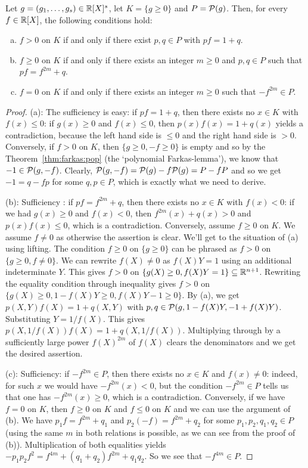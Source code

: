 \begin{theorem}
	\label{stellensaetze}
	Let $g = (g_1,\ldots,g_s) \in \mathbb{R}[X]^s$, let $K = \{ g \ge 0\}$ and $P= \mathcal{P}(g)$. Then, for every $f \in \mathbb{R}[X]$, the following conditions hold:
	\begin{enumerate}[(a)]
		\item $f>0$ on $K$ if and only if there exist $p, q \in P$ with $p f = 1+ q$. 
		\item $f \ge 0$ on $K$ if and only if there exists an integer $m \ge 0$ and $p, q \in P$ such that $p f = f^{2m} + q$. 
		\item $f=0$ on $K$ if and only if there exists an integer $m \ge 0$ such that $-f^{2m} \in P$. 
	\end{enumerate}
\end{theorem}
\begin{proof}
	(a): The sufficiency is easy: if $p f = 1+q$, then there exists no $x \in K$ with $f(x) \le 0$: if $g(x) \ge 0$ and $f(x) \le 0$, then $p(x) f(x) = 1+q(x)$ yields a contradiction, because the left hand side is $\le 0$ and the right hand side is $> 0$. Conversely,  if $f>0$ on $K$, then $\{ g \ge 0,-f \ge 0 \}$ is empty and so by the  Theorem~\ref{thm:farkas:pop} (the `polynomial Farkas-lemma'), we know that $-1 \in \mathcal{P}(g,-f)$. Clearly, $\mathcal{P}(g,-f) = \mathcal{P}(g) - f \mathcal{P}(g) = P - f P$ and so we get $-1 = q - f p$ for some $q, p \in P$, which is exactly what we need to derive. 
	
	(b): Sufficiency : if $p f = f^{2m} + q$, then there exists no $x \in K$ with $f(x) < 0$: if we had $g(x) \ge 0$ and $f(x) < 0$, then $f^{2m}(x) + q(x) > 0$ and $p(x) f(x) \le 0$, which is a contradiction. Conversely, assume $f \ge 0$ on $K$. We assume $f \ne 0$ as otherwise the assertion is clear. We'll get to the situation of (a) using lifting. The condition $f \ge 0$ on $\{g \ge 0\}$ can be phrased as $f > 0$ on $\{ g \ge 0, f \ne 0\}$. We can rewrite $f(X) \ne 0$ as $f(X) Y =1$ using an additional indeterminate $Y$. This gives $f > 0$ on $\{ g(X) \ge 0, f(X) Y =  1\} \subseteq \mathbb{R}^{n+1}$. Rewriting the equality condition through inequality gives $f> 0$ on $\{g(X) \ge 0, 1 - f(X) Y \ge 0, f(X) Y - 1 \ge 0\}$. By (a), we get 
	$p(X,Y) f(X) = 1+ q(X,Y) $ with $p, q \in \mathcal{P}(g,1-f(X) Y, -1 + f(X) Y)$. Substituting $Y = 1/f(X)$. This gives $p(X,1/f(X)) f(X) = 1 + q(X,1/f(X))$. Multiplying through by a sufficiently large power $f(X)^{2m}$ of $f(X)$ clears the denominators and we get the desired assertion. 
	
	(c): Sufficiency: if $- f^{2m} \in P$, then there exists no $x \in K$ and $f(x) \ne 0$: indeed, for such $x$ we would have $- f^{2m}(x) < 0$, but the condition $-f^{2m} \in P$ tells us that one has $-f^{2m}(x) \ge 0$, which is a contradiction. Conversely, if we have $f = 0$ on $K$, then $f \ge 0$ on $K$ and $f \le 0$ on $K$ and we can use the argument of (b). We have $p_1 f = f^{2m} + q_1$ and $p_2 (-f) = f^{2m} + q_2$ for some $p_1,p_2,q_1, q_2\in P$ (using the same $m$ in both relations is possible, as we can see from the proof of (b)). Multiplication of both equalities yields $-p_1 p_2 f^2 = f^{4m} + (q_1+q_2) f^{2m}  +q_1 q_2$. So we see that $-f^{4m} \in P$.   
\end{proof}

